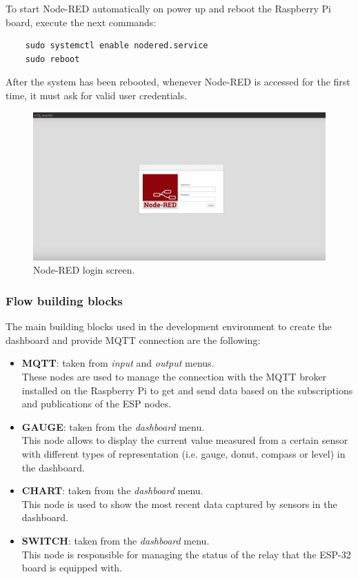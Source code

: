 \noindent
To start Node-RED automatically on power up and reboot the Raspberry Pi board, execute the next commands:

\begin{verbatim}
    sudo systemctl enable nodered.service
    sudo reboot
\end{verbatim}

\noindent
After the system has been rebooted, whenever Node-RED is accessed for the first time, it must ask for valid user credentials.

\begin{figure}[H]
	\begin{center}
		\includegraphics[width=1.0\textwidth]{./pictures/node-red-UI-login}
		\caption{Node-RED login screen.}
		\label{credentials_ui}
	\end{center}
\end{figure}

\subsubsection{Flow building blocks}
The main building blocks used in the development environment to create the dashboard and provide MQTT connection are the following:

\begin{itemize}
    \item \textbf{MQTT}: taken from \textit{input} and \textit{output} menus.\\
    These nodes are used to manage the connection with the MQTT broker installed on the Raspberry Pi to get and send data based on the subscriptions and publications of the ESP nodes.
    \item \textbf{GAUGE}: taken from the \textit{dashboard} menu.\\
    This node allows to display the current value measured from a certain sensor with different types of representation (i.e. gauge, donut, compass or level) in the dashboard.
    \item \textbf{CHART}: taken from the \textit{dashboard} menu.\\
    This node is used to show the most recent data captured by sensors in the dashboard.
    \item \textbf{SWITCH}: taken from the \textit{dashboard} menu.\\
    This node is responsible for managing the status of the relay that the ESP-32 board is equipped with.
\end{itemize}

